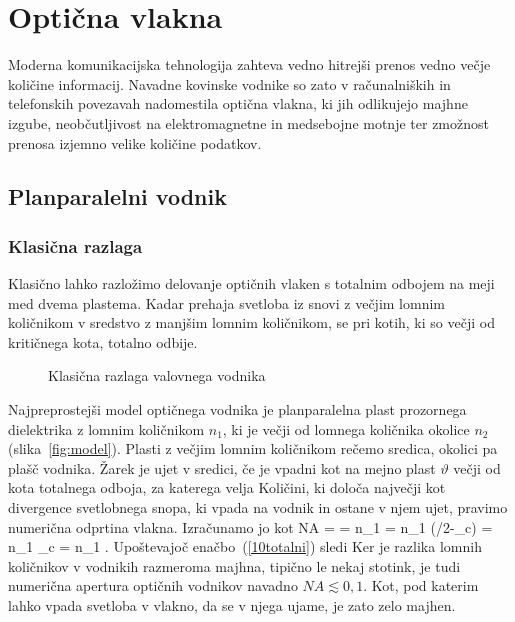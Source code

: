 
\chapter{Optična vlakna}
Moderna komunikacijska tehnologija zahteva vedno hitrejši prenos
vedno večje količine informacij. Navadne kovinske vodnike
so zato v računalniških in telefonskih povezavah nadomestila optična 
vlakna, ki jih odlikujejo majhne izgube, neobčutljivost na elektromagnetne
in medsebojne motnje ter zmožnost prenosa izjemno velike količine podatkov. 

\section{Planparalelni vodnik}
\subsection{Klasična razlaga}
Klasično lahko razložimo delovanje optičnih vlaken s totalnim odbojem
na meji med dvema plastema. Kadar prehaja svetloba iz snovi 
z večjim lomnim količnikom v sredstvo z manjšim lomnim količnikom,
se pri kotih, ki so večji od kritičnega kota, totalno odbije. 
\begin{figure}[h]
\centering
\def\svgwidth{120truemm} 

\caption{Klasična razlaga valovnega vodnika}
\label{fig:vodnik}
\end{figure}

Najpreprostejši model optičnega vodnika je planparalelna plast prozornega
dielektrika z lomnim količnikom $n_{1}$, ki je večji od lomnega količnika
okolice $n_2$ (slika~\ref{fig:model}). 
Plasti z večjim lomnim količnikom rečemo sredica, okolici
pa plašč vodnika. Žarek je ujet v sredici, če je vpadni kot 
na mejno plast $\vartheta$ večji od kota totalnega odboja, 
za katerega velja 
Količini, ki določa največji kot divergence svetlobnega snopa, 
ki vpada na vodnik in ostane v njem ujet, pravimo
numerična odprtina vlakna. Izračunamo jo kot 
\beq
NA = \sin \alpha = n_1 \sin \beta = 
n_1 \sin(\pi/2-\vartheta_c) =
n_1 \cos\vartheta_c = n_1 .
\eeq
Upoštevajoč enačbo~(\ref{10totalni}) sledi 
Ker je razlika lomnih količnikov v vodnikih razmeroma majhna,
tipično le nekaj stotink, je tudi numerična apertura optičnih 
vodnikov navadno
$NA \lesssim 0,1 $. Kot, pod katerim lahko vpada svetloba
v vlakno, da se v njega ujame, je zato zelo majhen. 

